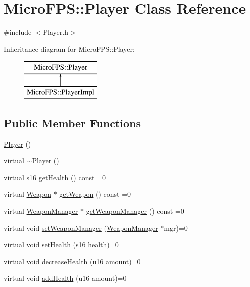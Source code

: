 \hypertarget{class_micro_f_p_s_1_1_player}{
\section{MicroFPS::Player Class Reference}
\label{dc/d87/class_micro_f_p_s_1_1_player}
}


{\ttfamily \#include $<$Player.h$>$}

Inheritance diagram for MicroFPS::Player:\begin{figure}[H]
\begin{center}
\leavevmode
\includegraphics[height=2.000000cm]{dc/d87/class_micro_f_p_s_1_1_player}
\end{center}
\end{figure}
\subsection*{Public Member Functions}
\begin{DoxyCompactItemize}
\item 
\hyperlink{class_micro_f_p_s_1_1_player_a180068a9d6a1f1fbd4a009e1a738db7f}{Player} ()
\item 
virtual \hyperlink{class_micro_f_p_s_1_1_player_a64e0f0e138281ae4e8fe35e20807b39f}{$\sim$Player} ()
\item 
virtual s16 \hyperlink{class_micro_f_p_s_1_1_player_a61d0d42c42bf519b5e499ba17a4b5fb0}{getHealth} () const =0
\item 
virtual \hyperlink{class_micro_f_p_s_1_1_weapon}{Weapon} $\ast$ \hyperlink{class_micro_f_p_s_1_1_player_a7ed768074f43284dd15b24b4d5ab9c87}{getWeapon} () const =0
\item 
virtual \hyperlink{class_micro_f_p_s_1_1_weapon_manager}{WeaponManager} $\ast$ \hyperlink{class_micro_f_p_s_1_1_player_ab691a249d2381824a253b32188371a59}{getWeaponManager} () const =0
\item 
virtual void \hyperlink{class_micro_f_p_s_1_1_player_ab1c3cc6a9b1f6275a734f8f2c1188bd3}{setWeaponManager} (\hyperlink{class_micro_f_p_s_1_1_weapon_manager}{WeaponManager} $\ast$mgr)=0
\item 
virtual void \hyperlink{class_micro_f_p_s_1_1_player_a05e06a8d76923d00af2b1f7650fbbeab}{setHealth} (s16 health)=0
\item 
virtual void \hyperlink{class_micro_f_p_s_1_1_player_acfd29eac2567aa8fae1ab9c5c2b3809f}{decreaseHealth} (u16 amount)=0
\item 
virtual void \hyperlink{class_micro_f_p_s_1_1_player_a9ae7cf9c4f7c0dcaf708fc3b03ab90ba}{addHealth} (u16 amount)=0
\end{DoxyCompactItemize}


